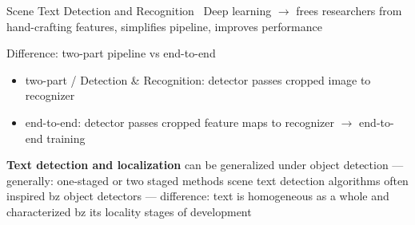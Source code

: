 Scene Text Detection and Recognition~\cite{long_scene_2021}
Deep learning $\rightarrow$ frees researchers from hand-crafting features, simplifies pipeline,
    improves performance

Difference: two-part pipeline vs end-to-end
\begin{itemize}
    \item two-part / Detection \& Recognition: detector passes cropped image to recognizer
    \item end-to-end: detector passes cropped feature maps to recognizer $\rightarrow$ end-to-end
            training
\end{itemize}

\textbf{Text detection and localization}
can be generalized under object detection --- generally: one-staged or two staged methods
scene text detection algorithms often inspired bz object detectors --- difference:
        text is homogeneous as a whole and characterized bz its locality
stages of development
